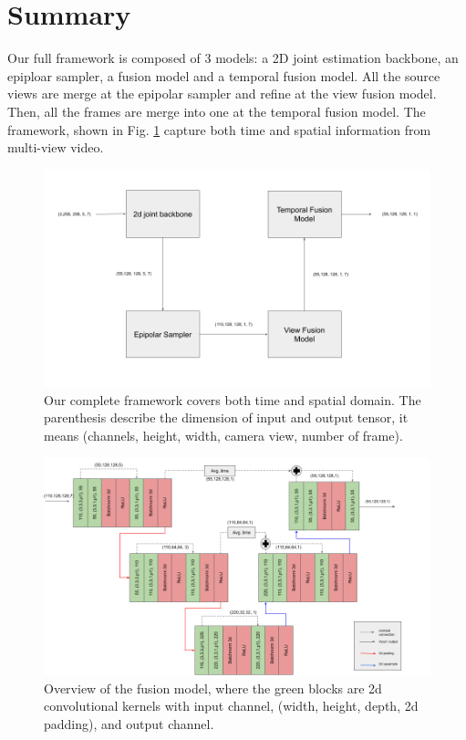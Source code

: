 \section{Summary}
Our full framework is composed of 3 models: a 2D joint estimation backbone, an epiploar sampler, a fusion model and a temporal fusion model. All the source views are merge at the epipolar sampler and refine at the view fusion model. Then, all the frames are merge into one at the temporal fusion model. The framework, shown in Fig. \ref{fig:full-framework} capture both time and spatial information from multi-view video.
\begin{figure}
	\centering
	\includegraphics[width=0.7\columnwidth]{figures/ch4/full-model.png}
	\caption{Our complete framework covers both time and spatial domain. The parenthesis describe the dimension of input and output tensor, it means (channels, height, width, camera view, number of frame).}
	\label{fig:full-framework}
\end{figure}
\begin{figure}
	\centering
	\includegraphics[width=1.0\columnwidth]{figures/ch4/temporal-fusion.png}
	\caption{Overview of the fusion model, where the green blocks are 2d convolutional kernels with input channel, (width, height, depth, 2d padding), and output channel.}
	\label{fig:view-baseline}
\end{figure}
